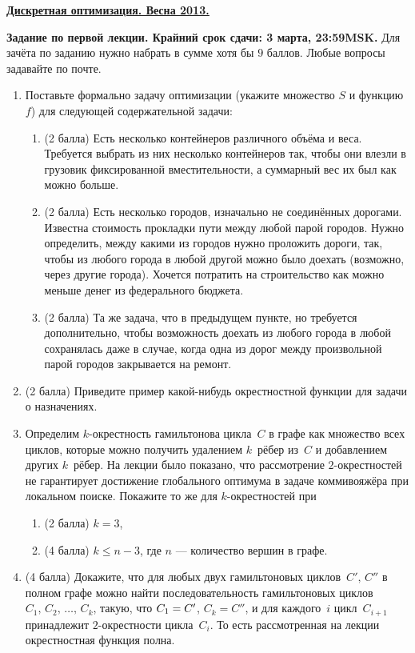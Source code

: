 \documentclass[russian,a4paper,12pt]{article}
\renewcommand{\le}{\leqslant}
\newcommand*{\hm}[1]{#1\nobreak\discretionary{}{\hbox{$#1$}}{}}
\begin{document}
\centerline{\bf \href{http://www.dainiak.com}{\underline{Дискретная оптимизация. Весна 2013.}}}\bigskip
{\bf Задание по первой лекции. Крайний срок сдачи: 3 марта, 23:59MSK.} Для зачёта по заданию нужно набрать в сумме хотя бы $9$ баллов. Любые вопросы задавайте по почте.
\begin{enumerate}
\item Поставьте формально задачу оптимизации (укажите множество $S$ и функцию $f$) для следующей содержательной задачи:
    \begin{enumerate}
    \item (2 балла) Есть несколько контейнеров различного объёма и веса. Требуется выбрать из них несколько контейнеров так, чтобы они влезли в грузовик фиксированной вместительности, а суммарный вес их был как можно больше.
    \item (2 балла) Есть несколько городов, изначально не соединённых дорогами. Известна стоимость прокладки пути между любой парой городов. Нужно определить, между какими из городов нужно проложить дороги, так, чтобы из любого города в любой другой можно было доехать (возможно, через другие города). Хочется потратить на строительство как можно меньше денег из федерального бюджета.
    \item (2 балла) Та же задача, что в предыдущем пункте, но требуется дополнительно, чтобы возможность доехать из любого города в любой сохранялась даже в случае, когда одна из дорог между произвольной парой городов закрывается на ремонт.
    \end{enumerate}
\item (2 балла) Приведите пример какой-нибудь окрестностной функции для задачи о назначениях.

\item Определим $k$-окрестность гамильтонова цикла~$C$ в графе как множество всех циклов, которые можно получить удалением $k$~рёбер из~$C$ и добавлением других $k$~рёбер. На лекции было показано, что рассмотрение $2$-окрестностей не гарантирует достижение глобального оптимума в задаче коммивояжёра при локальном поиске. Покажите то же для $k$-окрестностей при
    \begin{enumerate}
    \item (2 балла) $k=3$,
    \item (4 балла) $k\le n-3$, где $n$ --- количество вершин в графе.
    \end{enumerate}
\item (4 балла) Докажите, что для любых двух гамильтоновых циклов~$C',\,C''$ в полном графе можно найти последовательность гамильтоновых циклов $C_1,\,C_2,\,\ldots,\,C_k$, такую, что $C_1\hm=C'$, $C_k=C''$, и для каждого~$i$ цикл~$C_{i+1}$ принадлежит $2$-окрестности цикла~$C_i$. То есть рассмотренная на лекции окрестностная функция полна.
\end{enumerate}
\end{document}
